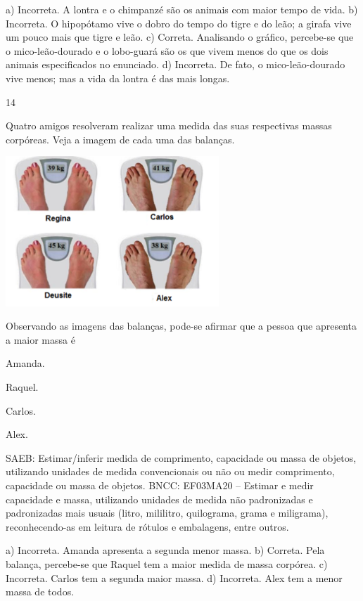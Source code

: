\begin{multicols}{2}
\begin{enumerate}
{a) Incorreta. A lontra e o chimpanzé são os animais com maior tempo de vida.
b) Incorreta. O hipopótamo vive o dobro do tempo do tigre e do leão; a girafa vive um pouco mais que tigre e leão.
c) Correta. Analisando o gráfico, percebe-se que o mico-leão-dourado e o lobo-guará são os que vivem menos do que os dois animais especificados no enunciado.
d) Incorreta. De fato, o mico-leão-dourado vive menos; mas a vida da lontra é das mais longas.

\num{14}

Quatro amigos resolveram realizar uma medida das suas respectivas massas corpóreas. Veja a imagem de cada uma das balanças.


\includegraphics[width=3.15196in,height=2.22201in]{media/image128.png}

Observando as imagens das balanças, pode-se afirmar que a pessoa que apresenta a maior massa é

\begin{escolha}

\item
  Amanda.
\item
  Raquel.
\item
  Carlos.
\item
  Alex.
\end{escolha}


SAEB: Estimar/inferir medida de comprimento, capacidade ou
massa de objetos, utilizando unidades de medida convencionais ou não ou
medir comprimento, capacidade ou massa de objetos.
BNCC: EF03MA20 -- Estimar e medir capacidade e massa, utilizando unidades de medida não
padronizadas e padronizadas mais usuais (litro, mililitro, quilograma, grama e miligrama),
reconhecendo-as em leitura de rótulos e embalagens, entre outros.

a) Incorreta. Amanda apresenta a segunda menor massa.
b) Correta. Pela balança, percebe-se que Raquel tem a maior medida de massa corpórea.
c) Incorreta. Carlos tem a segunda maior massa.
d) Incorreta. Alex tem a menor massa de todos.

}
\end{enumerate}
\end{multicols}

